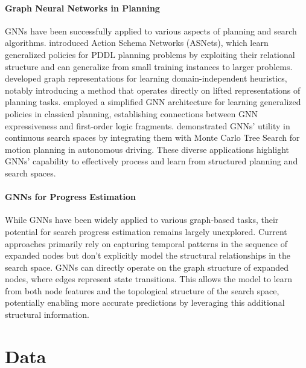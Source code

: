 \documentclass[letterpaper]{article}
\begin{document}
\paragraph{Graph Neural Networks in Planning} GNNs have been successfully applied to various aspects of planning and search algorithms. \citet{toyer2020asnets} introduced Action Schema Networks (ASNets), which learn generalized policies for PDDL planning problems by exploiting their relational structure and can generalize from small training instances to larger problems. \citet{chen2024learning} developed graph representations for learning domain-independent heuristics, notably introducing a method that operates directly on lifted representations of planning tasks. \citet{staahlberg2022learning} employed a simplified GNN architecture for learning generalized policies in classical planning, establishing connections between GNN expressiveness and first-order logic fragments. \citet{9636442} demonstrated GNNs' utility in continuous search spaces by integrating them with Monte Carlo Tree Search for motion planning in autonomous driving. These diverse applications highlight GNNs' capability to effectively process and learn from structured planning and search spaces.

\paragraph{GNNs for Progress Estimation} While GNNs have been widely applied to various graph-based tasks, their potential for search progress estimation remains largely unexplored. Current approaches primarily rely on capturing temporal patterns in the sequence of expanded nodes but don't explicitly model the structural relationships in the search space. GNNs can directly operate on the graph structure of expanded nodes, where edges represent state transitions. This allows the model to learn from both node features and the topological structure of the search space, potentially enabling more accurate predictions by leveraging this additional structural information.

\section{Data}
\end{document}

